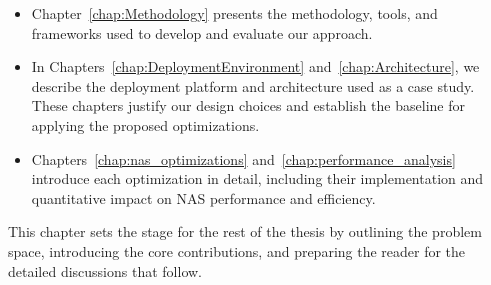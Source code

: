 \begin{itemize}

    \item Chapter~\ref{chap:Methodology} presents the methodology, tools, and frameworks used to develop and evaluate our approach.
    
    \item In Chapters~\ref{chap:DeploymentEnvironment} and~\ref{chap:Architecture}, we describe the deployment platform and architecture used as a case study. These chapters justify our design choices and establish the baseline for applying the proposed optimizations.
    
    \item Chapters~\ref{chap:nas_optimizations} and~\ref{chap:performance_analysis} introduce each optimization in detail, including their implementation and quantitative impact on NAS performance and efficiency.
    
\end{itemize}


This chapter sets the stage for the rest of the thesis by outlining the problem space, introducing the core contributions, and preparing the reader for the detailed discussions that follow.
